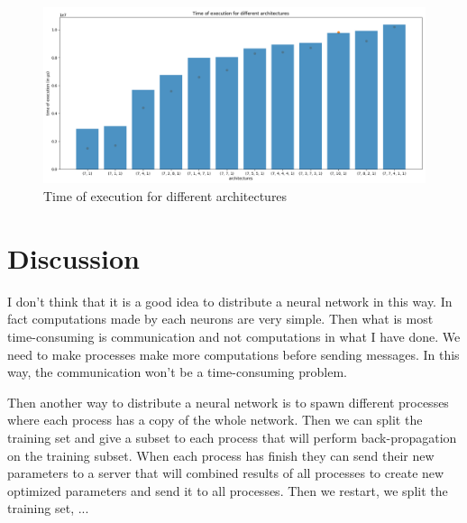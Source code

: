 \documentclass[12pt]{article}
\begin{document}
\begin{figure}
	\includegraphics[scale=0.45]{time.png}
	\caption{Time of execution for different architectures}
	\label{time}
\end{figure}

\section{Discussion}

I don't think that it is a good idea to distribute a neural network in this way. In fact computations made by each neurons are very simple. Then what is most time-consuming is communication and not computations in what I have done. We need to make processes make more computations before sending messages. In this way, the communication won't be a time-consuming problem. 

Then another way to distribute a neural network is to spawn different processes where each process has a copy of the whole network. Then we can split the training set and give a subset to each process that will perform back-propagation on the training subset. When each process has finish they can send their new parameters to a server that will combined results of all processes to create new optimized parameters and send it to all processes. Then we restart, we split the training set, ... 
\end{document}
